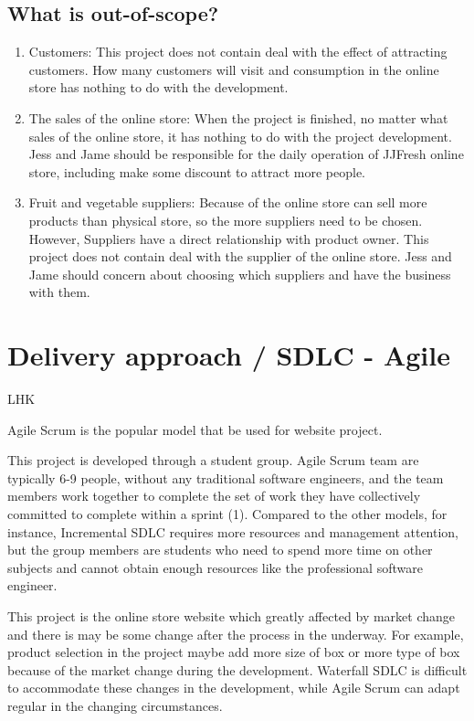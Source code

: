\documentclass{report}
\begin{document}
\subsection{What is out-of-scope?}
\begin{enumerate}
  \item Customers: This project does not contain deal with the effect of attracting customers. How many customers will visit and consumption in the online store has nothing to do with the development.
  \item The sales of the online store: When the project is finished, no matter what sales of the online store, it has nothing to do with the project development. Jess and Jame should be responsible for the daily operation of JJFresh online store, including make some discount to attract more people.
  \item Fruit and vegetable suppliers: Because of the online store can sell more products than physical store, so the more suppliers need to be chosen. However, Suppliers have a direct relationship with product owner. This project does not contain deal with the supplier of the online store. Jess and Jame should concern about choosing which suppliers and have the business with them.
\end{enumerate}
\section{Delivery approach / SDLC - Agile}
LHK

Agile Scrum is the popular model that be used for website project.

This project is developed through a student group. Agile Scrum team are typically 6-9 people, without any traditional software engineers, and the team members work together to complete the set of work they have collectively committed to complete within a sprint (1). Compared to the other models, for instance, Incremental SDLC requires more resources and management attention, but the group members are students who need to spend more time on other subjects and cannot obtain enough resources like the professional software engineer.

This project is the online store website which greatly affected by market change and there is may be some change after the process in the underway. For example, product selection in the project maybe add more size of box or more type of box because of the market change during the development. Waterfall SDLC is difficult to accommodate these changes in the development, while Agile Scrum can adapt regular in the changing circumstances.
\end{document}
